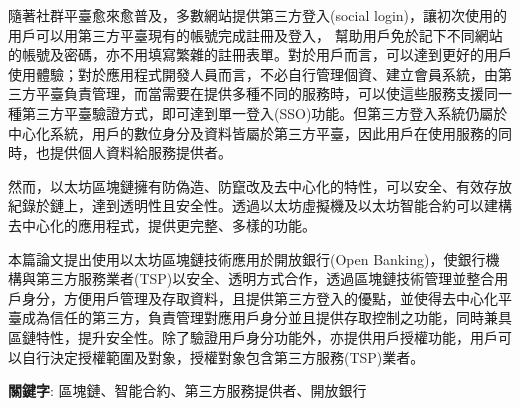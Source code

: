 \begin{abstractzh}

    隨著社群平臺愈來愈普及，多數網站提供第三方登入(social login)，讓初次使用的用戶可以用第三方平臺現有的帳號完成註冊及登入，
    幫助用戶免於記下不同網站的帳號及密碼，亦不用填寫繁雜的註冊表單。對於用戶而言，可以達到更好的用戶使用體驗；對於應用程式開發人員而言，不必自行管理個資、建立會員系統，由第三方平臺負責管理，而當需要在提供多種不同的服務時，可以使這些服務支援同一種第三方平臺驗證方式，即可達到單一登入(SSO)功能。但第三方登入系統仍屬於中心化系統，用戶的數位身分及資料皆屬於第三方平臺，因此用戶在使用服務的同時，也提供個人資料給服務提供者。\par
    然而，以太坊區塊鏈擁有防偽造、防竄改及去中心化的特性，可以安全、有效存放紀錄於鏈上，達到透明性且安全性。透過以太坊虛擬機及以太坊智能合約可以建構去中心化的應用程式，提供更完整、多樣的功能。\par
    本篇論文提出使用以太坊區塊鏈技術應用於開放銀行(Open Banking)，使銀行機構與第三方服務業者(TSP)以安全、透明方式合作，透過區塊鏈技術管理並整合用戶身分，方便用戶管理及存取資料，且提供第三方登入的優點，並使得去中心化平臺成為信任的第三方，負責管理對應用戶身分並且提供存取控制之功能，同時兼具區鏈特性，提升安全性。除了驗證用戶身分功能外，亦提供用戶授權功能，用戶可以自行決定授權範圍及對象，授權對象包含第三方服務(TSP)業者。

\end{abstractzh}

\begin{flushleft}
    \textbf{關鍵字}: 區塊鏈、智能合約、第三方服務提供者、開放銀行
\end{flushleft}